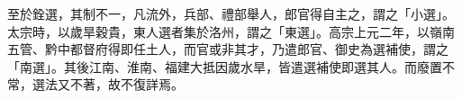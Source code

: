 \begin{pinyinscope}
 至於銓選，其制不一，凡流外，兵部、禮部舉人，郎官得自主之，謂之「小選」。太宗時，以歲旱穀貴，東人選者集於洛州，謂之「東選」。高宗上元二年，以嶺南五管、黔中都督府得即任土人，而官或非其才，乃遣郎官、御史為選補使，謂之「南選」。其後江南、淮南、福建大抵因歲水旱，皆遣選補使即選其人。而廢置不常，選法又不著，故不復詳焉。



\end{pinyinscope}